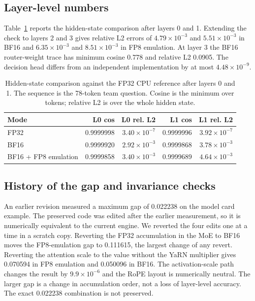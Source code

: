 \documentclass[11pt,a4paper]{article}
\begin{document}
\subsection{Layer-level numbers}

Table~\ref{tab:layers} reports the hidden-state comparison after layers 0 and 1. Extending the check to layers 2 and 3 gives relative L2 errors of $4.79\times10^{-3}$ and $5.51\times10^{-3}$ in BF16 and $6.35\times10^{-3}$ and $8.51\times10^{-3}$ in FP8 emulation. At layer 3 the BF16 router-weight trace has minimum cosine 0.778 and relative L2 0.0905. The decision head differs from an independent implementation by at most $4.48\times10^{-9}$.

\begin{table}[!htbp]
\centering
\small
\caption{Hidden-state comparison against the FP32 CPU reference after layers 0 and 1. The sequence is the 78-token team question. Cosine is the minimum over tokens; relative L2 is over the whole hidden state.}
\label{tab:layers}
\begin{tabular}{lrrrr}
\toprule
Mode & L0 cos & L0 rel. L2 & L1 cos & L1 rel. L2 \\
\midrule
FP32 & 0.9999998 & $3.40\times10^{-7}$ & 0.9999996 & $3.92\times10^{-7}$ \\
BF16 & 0.9999920 & $2.92\times10^{-3}$ & 0.9999868 & $3.78\times10^{-3}$ \\
BF16 + FP8 emulation & 0.9999858 & $3.40\times10^{-3}$ & 0.9999689 & $4.64\times10^{-3}$ \\
\bottomrule
\end{tabular}
\end{table}

\subsection{History of the gap and invariance checks}

An earlier revision measured a maximum gap of 0.022238 on the model card example. The preserved code was edited after the earlier measurement, so it is numerically equivalent to the current engine. We reverted the four edits one at a time in a scratch copy. Reverting the FP32 accumulation in the MoE to BF16 moves the FP8-emulation gap to 0.111615, the largest change of any revert. Reverting the attention scale to the value without the YaRN multiplier gives 0.070594 in FP8 emulation and 0.050096 in BF16. The activation-scale path changes the result by $9.9\times10^{-6}$ and the RoPE layout is numerically neutral. The larger gap is a change in accumulation order, not a loss of layer-level accuracy. The exact 0.022238 combination is not preserved.
\end{document}
